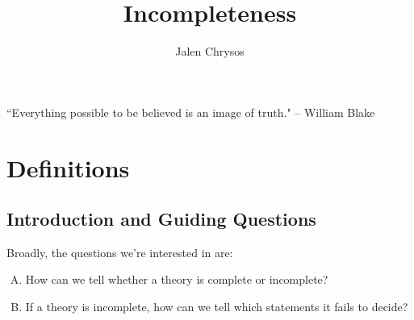 \documentclass{amsart}
\title{Incompleteness}
\author{Jalen Chrysos}
\begin{document}
	\maketitle
	
	\begin{center}
		``Everything possible to be believed is an image of truth." -- William Blake
	\end{center}
	
	\tableofcontents
	
	\section{Definitions}
	
	\subsection{Introduction and Guiding Questions} 
%	
%	

	Broadly, the questions we're interested in are:\\
	\begin{enumerate}[(A)]
		\item How can we tell whether a theory is complete or incomplete?
		\item If a theory is incomplete, how can we tell which statements it fails to decide?
	\end{enumerate}
	
\end{document}
